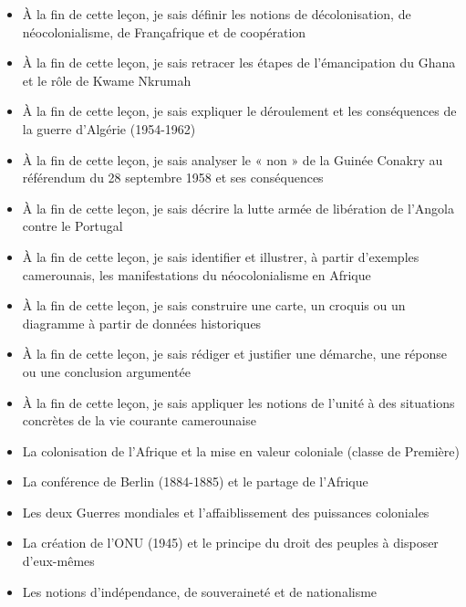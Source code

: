 \documentclass[11pt]{article}
\begin{document}
\begin{objectifs}
\begin{itemize}
\item À la fin de cette leçon, je sais définir les notions de décolonisation, de néocolonialisme, de Françafrique et de coopération
\item À la fin de cette leçon, je sais retracer les étapes de l'émancipation du Ghana et le rôle de Kwame Nkrumah
\item À la fin de cette leçon, je sais expliquer le déroulement et les conséquences de la guerre d'Algérie (1954-1962)
\item À la fin de cette leçon, je sais analyser le « non » de la Guinée Conakry au référendum du 28 septembre 1958 et ses conséquences
\item À la fin de cette leçon, je sais décrire la lutte armée de libération de l'Angola contre le Portugal
\item À la fin de cette leçon, je sais identifier et illustrer, à partir d'exemples camerounais, les manifestations du néocolonialisme en Afrique
\item À la fin de cette leçon, je sais construire une carte, un croquis ou un diagramme à partir de données historiques
\item À la fin de cette leçon, je sais rédiger et justifier une démarche, une réponse ou une conclusion argumentée
\item À la fin de cette leçon, je sais appliquer les notions de l'unité à des situations concrètes de la vie courante camerounaise
\end{itemize}
\end{objectifs}

\begin{prerequis}
\begin{itemize}
\item La colonisation de l'Afrique et la mise en valeur coloniale (classe de Première)
\item La conférence de Berlin (1884-1885) et le partage de l'Afrique
\item Les deux Guerres mondiales et l'affaiblissement des puissances coloniales
\item La création de l'ONU (1945) et le principe du droit des peuples à disposer d'eux-mêmes
\item Les notions d'indépendance, de souveraineté et de nationalisme
\end{itemize}
\end{prerequis}
\end{document}
